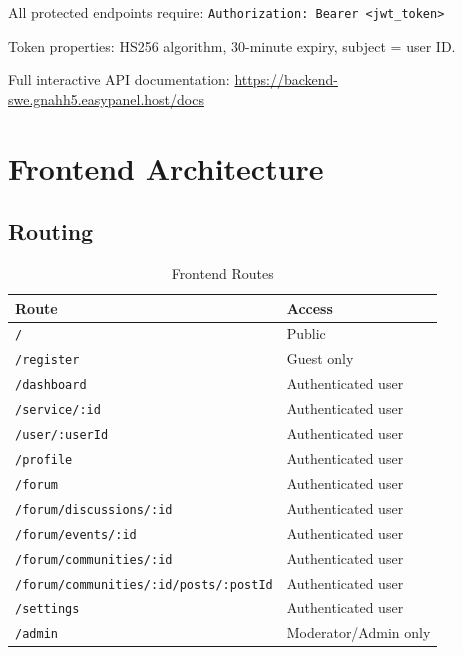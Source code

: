 \documentclass[10pt,a4paper]{report}
\begin{document}
All protected endpoints require: \texttt{Authorization: Bearer <jwt\_token>}

Token properties: HS256 algorithm, 30-minute expiry, subject = user ID.

Full interactive API documentation: \url{https://backend-swe.gnahh5.easypanel.host/docs}

\section{Frontend Architecture}

\subsection{Routing}

\begin{table}[h]
    \centering
    \begin{tabular}{|l|l|}
        \hline
        \textbf{Route}                                & \textbf{Access}       \\
        \hline
        \texttt{/}                                    & Public                \\
        \hline
        \texttt{/register}                            & Guest only            \\
        \hline
        \texttt{/dashboard}                           & Authenticated user    \\
        \hline
        \texttt{/service/:id}                         & Authenticated user    \\
        \hline
        \texttt{/user/:userId}                        & Authenticated user    \\
        \hline
        \texttt{/profile}                             & Authenticated user    \\
        \hline
        \texttt{/forum}                               & Authenticated user    \\
        \hline
        \texttt{/forum/discussions/:id}               & Authenticated user    \\
        \hline
        \texttt{/forum/events/:id}                    & Authenticated user    \\
        \hline
        \texttt{/forum/communities/:id}               & Authenticated user    \\
        \hline
        \texttt{/forum/communities/:id/posts/:postId} & Authenticated user    \\
        \hline
        \texttt{/settings}                            & Authenticated user    \\
        \hline
        \texttt{/admin}                               & Moderator/Admin only  \\
        \hline
    \end{tabular}
    \caption{Frontend Routes}
\end{table}
\end{document}
